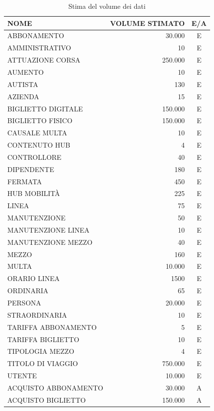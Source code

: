 \documentclass[12pt,a4paper]{report}
\begin{document}
\begin{longtable}{|p{7.5cm}|r|c|}
\caption{Stima del volume dei dati}
\label{table:volumeDati}\\
\hline
\textbf{NOME} & \textbf{VOLUME STIMATO} & \textbf{E/A} \\
\hline
\endhead

ABBONAMENTO & 30.000 & E \\
\hline
AMMINISTRATIVO & 10 & E \\
\hline
ATTUAZIONE CORSA & 250.000 & E \\
\hline
AUMENTO & 10 & E \\
\hline
AUTISTA & 130 & E \\
\hline
AZIENDA & 15 & E\\
\hline
BIGLIETTO DIGITALE & 150.000 & E \\
\hline
BIGLIETTO FISICO & 150.000 & E \\
\hline
CAUSALE MULTA & 10 & E \\
\hline
CONTENUTO HUB & 4 & E \\
\hline
CONTROLLORE & 40 & E \\
\hline
DIPENDENTE & 180 & E \\
\hline
FERMATA & 450 & E \\
\hline
HUB MOBILITÀ & 225 & E \\
\hline
LINEA & 75 & E \\
\hline
MANUTENZIONE & 50 & E \\
\hline
MANUTENZIONE LINEA & 10 & E \\
\hline
MANUTENZIONE MEZZO & 40 & E \\
\hline
MEZZO & 160 & E \\
\hline
MULTA & 10.000 & E \\
\hline
ORARIO LINEA & 1500 & E \\
\hline
ORDINARIA & 65 & E \\
\hline
PERSONA & 20.000 & E \\
\hline
STRAORDINARIA & 10 & E \\
\hline
TARIFFA ABBONAMENTO & 5 & E \\
\hline
TARIFFA BIGLIETTO & 10 & E \\
\hline
TIPOLOGIA MEZZO & 4 & E \\
\hline
TITOLO DI VIAGGIO & 750.000 & E \\
\hline
UTENTE & 10.000 & E \\
\hline
ACQUISTO ABBONAMENTO & 30.000 & A \\
\hline
ACQUISTO BIGLIETTO & 150.000 & A \\

\end{longtable}
\end{document}
